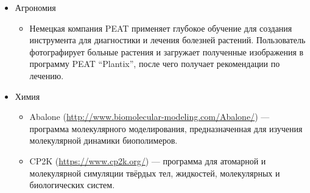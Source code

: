 \begin{itemize}
\item{Агрономия}

\begin{itemize}
\item{Немецкая компания PEAT применяет глубокое обучение для создания инструмента для диагностики и лечения болезней растений. Пользователь фотографирует больные растения и загружает полученные изображения в программу PEAT ``Plantix'', после чего получает рекомендации по лечению\cite{almanac3}.}
\end{itemize}

\item{Химия}

\begin{itemize}
\item{Abalone (\url{http://www.biomolecular-modeling.com/Abalone/}) --- программа молекулярного моделирования, предназначенная для изучения молекулярной динамики биополимеров\cite{chem}.}

\item{CP2K (\url{https://www.cp2k.org/}) --- программа для атомарной и молекулярной симуляции твёрдых тел, жидкостей, молекулярных и биологических систем\cite{chem}.}


\end{itemize}
\end{itemize}
